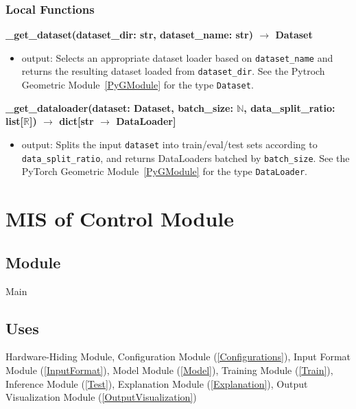 \documentclass[12pt, titlepage]{article}
\begin{document}
\subsubsection{Local Functions}

\noindent \textbf{\_get\_dataset(dataset\_dir: str, dataset\_name: str) $\rightarrow$ Dataset}
\begin{itemize}
  \item output: Selects an appropriate dataset loader based on \texttt{dataset\_name} and returns the resulting dataset loaded from \texttt{dataset\_dir}. See the Pytroch Geometric Module~\ref{PyGModule} for the type \texttt{Dataset}.
\end{itemize}

\noindent \textbf{\_get\_dataloader(dataset: Dataset, batch\_size: \(\mathbb{N}\), data\_split\_ratio: list[\(\mathbb{R}\)]) $\rightarrow$ dict[str $\rightarrow$ DataLoader]}
\begin{itemize}
  \item output: Splits the input \texttt{dataset} into train/eval/test sets according to \texttt{data\_split\_ratio}, and returns DataLoaders batched by \texttt{batch\_size}. See the PyTorch Geometric Module~\ref{PyGModule} for the type \texttt{DataLoader}.
\end{itemize}



\newpage










\section{MIS of Control Module} \label{Control}

\subsection{Module}
Main

\subsection{Uses}
Hardware-Hiding Module, Configuration Module (\ref{Configurations}), Input Format Module (\ref{InputFormat}), Model Module (\ref{Model}), Training Module (\ref{Train}), Inference Module (\ref{Test}), 
Explanation Module (\ref{Explanation}), Output Visualization Module (\ref{OutputVisualization})
\end{document}
